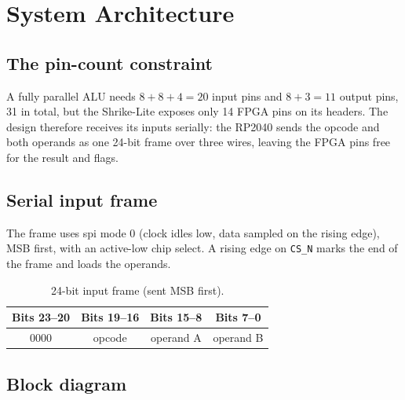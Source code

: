 \documentclass[12pt,a4paper,twoside]{article}
\begin{document}
\section{System Architecture}

\subsection{The pin-count constraint}

A fully parallel ALU needs $8 + 8 + 4 = 20$ input pins and $8 + 3 = 11$ output
pins, 31 in total, but the Shrike-Lite exposes only 14 FPGA pins on its headers.
The design therefore receives its inputs serially: the RP2040 sends the opcode and
both operands as one 24-bit frame over three wires, leaving the FPGA pins free for
the result and flags.

\subsection{Serial input frame}

The frame uses \gls{spi} mode 0 (clock idles low,
data sampled on the rising edge), MSB first, with an active-low chip select. A
rising edge on \texttt{CS\_N} marks the end of the frame and loads the operands.

\begin{table}[H]
\centering
\caption{24-bit input frame (sent MSB first).}
\label{tab:frame}
\begin{tabular}{@{}cccc@{}}
\toprule
\textbf{Bits 23--20} & \textbf{Bits 19--16} & \textbf{Bits 15--8} & \textbf{Bits 7--0} \\
\midrule
0000 & opcode & operand A & operand B \\
\bottomrule
\end{tabular}
\end{table}

\subsection{Block diagram}
\end{document}
